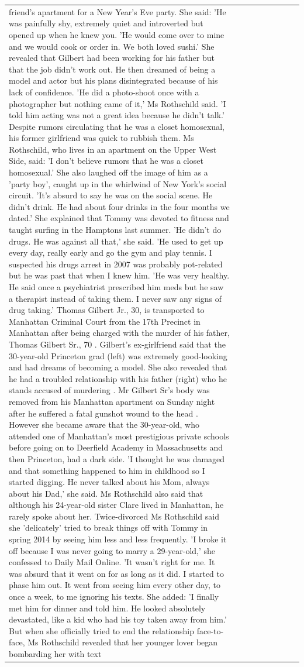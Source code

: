 \begin{table}[H]
\begin{tabular}{lllrlllll}
friend’s apartment for a New Year’s Eve party. She said: 'He was painfully shy, extremely quiet and introverted but opened up when he knew you. 'He would come over to mine and we would cook or order in. We both loved sushi.' She revealed that Gilbert had been working for his father but that the job didn't work out. He then dreamed of being a model and actor but his plans disintegrated because of his lack of confidence. 'He did a photo-shoot once with a photographer but nothing came of it,' Ms Rothschild said. 'I told him acting was not a great idea because he didn’t talk.' Despite rumors circulating that he was a closet homosexual, his former girlfriend was quick to rubbish them. Ms Rothschild, who lives in an apartment on the Upper West Side, said: 'I don’t believe rumors that he was a closet homosexual.' She also laughed off the image of him as a 'party boy', caught up in the whirlwind of New York's social circuit. 'It’s absurd to say he was on the social scene. He didn’t drink. He had about four drinks in the four months we dated.' She explained that Tommy was devoted to fitness and taught surfing in the Hamptons last summer. 'He didn’t do drugs. He was against all that,' she said. 'He used to get up every day, really early and go the gym and play tennis. I suspected his drugs arrest in 2007 was probably pot-related but he was past that when I knew him. 'He was very healthy. He said once a psychiatrist prescribed him meds but he saw a therapist instead of taking them. I never saw any signs of drug taking.' Thomas Gilbert Jr., 30, is transported to Manhattan Criminal Court from the 17th Precinct in Manhattan after being charged with the murder of his father, Thomas Gilbert Sr., 70 . Gilbert's ex-girlfriend said that the 30-year-old Princeton grad (left) was extremely good-looking and had dreams of becoming a model. She also revealed that he had a troubled relationship with his father (right) who he stands accused of murdering . Mr Gilbert Sr's body was removed from his Manhattan apartment on Sunday night after he suffered a fatal gunshot wound to the head . However she became aware that the 30-year-old, who attended one of Manhattan's most prestigious private schools before going on to Deerfield Academy in Massachusetts and then Princeton, had a dark side. 'I thought he was damaged and that something happened to him in childhood so I started digging. He never talked about his Mom, always about his Dad,' she said. Ms Rothschild also said that although his 24-year-old sister Clare lived in Manhattan, he rarely spoke about her. Twice-divorced Ms Rothschild said she 'delicately' tried to break things off with Tommy in spring 2014 by seeing him less and less frequently. 'I broke it off because I was never going to marry a 29-year-old,' she confessed to Daily Mail Online. 'It wasn’t right for me. It was absurd that it went on for as long as it did. I started to phase him out. It went from seeing him every other day, to once a week, to me ignoring his texts. She added: 'I finally met him for dinner and told him. He looked absolutely devastated, like a kid who had his toy taken away from him.' But when she officially tried to end the relationship face-to-face, Ms Rothschild revealed that her younger lover began bombarding her with text 
\end{tabular}
\end{table}
